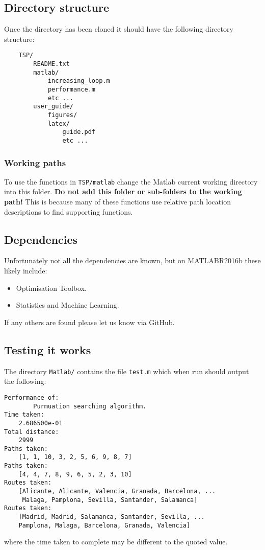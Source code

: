 \subsection{Directory structure}
\label{subsec:directory_structure}

Once the directory has been cloned it should have the following directory structure:
\\
\noindent
\begin{minipage}{\linewidth}
\begin{verbatim}
    TSP/
        README.txt
        matlab/
            increasing_loop.m
            performance.m
            etc ...
        user_guide/
            figures/
            latex/
                guide.pdf
                etc ...
\end{verbatim}
\end{minipage}





\subsubsection{Working paths}
\label{subsubsec:working_paths}

To use the functions in \texttt{TSP/matlab} change the Matlab current working directory into this folder. \textbf{Do not add this folder or sub-folders to the working path!} This is because many of these functions use relative path location descriptions to find supporting functions. 

\subsection{Dependencies}
\label{subsec:dependencies}

Unfortunately not all the dependencies are known, but on MATLABR2016b these likely include:
\begin{itemize}
	\item Optimisation Toolbox.
	\item Statistics and Machine Learning.
\end{itemize}
If any others are found please let us know via GitHub.


\subsection{Testing it works}
\label{subsec:testing_it_works}

The directory \texttt{Matlab/} contains the file \verb|test.m| which when run should output the following: \\
\noindent
\begin{verbatim}
Performance of:
        Purmuation searching algorithm.
Time taken:
    2.686500e-01
Total distance:
    2999
Paths taken:
    [1, 1, 10, 3, 2, 5, 6, 9, 8, 7]
Paths taken:
    [4, 4, 7, 8, 9, 6, 5, 2, 3, 10]
Routes taken:
    [Alicante, Alicante, Valencia, Granada, Barcelona, ...
     Malaga, Pamplona, Sevilla, Santander, Salamanca]
Routes taken:
    [Madrid, Madrid, Salamanca, Santander, Sevilla, ...
    Pamplona, Malaga, Barcelona, Granada, Valencia]
\end{verbatim}
where the time taken to complete may be different to the quoted value. 

